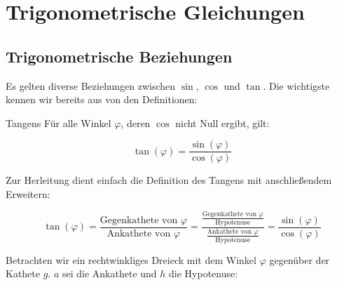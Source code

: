 
\section{Trigonometrische Gleichungen}

\subsection{Trigonometrische Beziehungen}
Es gelten diverse Beziehungen zwischen $\sin$, $\cos$ und $\tan$. Die
wichtigste kennen wir bereits aus von den Definitionen:

\begin{gesetz}{Tangens}{}
  Für alle Winkel $\varphi$, deren $\cos$ nicht Null ergibt, gilt:

  $$\tan(\varphi) = \frac{\sin(\varphi)}{\cos(\varphi)}$$
  \end{gesetz}
Zur Herleitung dient einfach die Definition des Tangens mit
anschließendem Erweitern:

$$\tan(\varphi) = \frac{\textrm{Gegenkathete von
  }\varphi}{\textrm{Ankathete von }\varphi} =
\frac{\frac{\textrm{Gegenkathete von }
    \varphi}{\textrm{Hypotenuse}}}{\frac{\textrm{Ankathete von }\varphi}{\textrm{Hypotenuse}}}
=\frac{\sin(\varphi)}{\cos(\varphi)}$$
\newpage

Betrachten wir ein rechtwinkliges Dreieck mit dem Winkel $\varphi$
gegenüber der Kathete $g$. $a$ sei die Ankathete und $h$ die
Hypotenuse:



